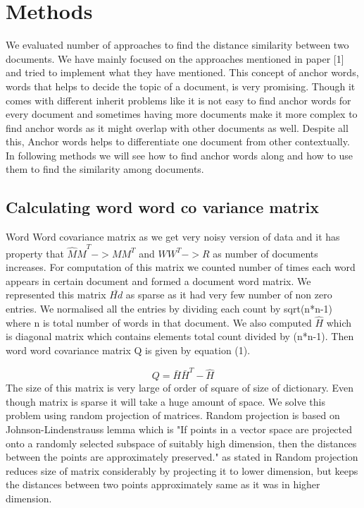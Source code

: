 \documentclass[a4paper,11pt]{article}
\begin{document}
\section{Methods}
We evaluated number of approaches to find the distance similarity between two documents. We have mainly focused on the approaches mentioned in paper [1] and tried to implement what they have mentioned. This concept of anchor words, words that helps to decide the topic of a document, is very promising. Though it comes with different inherit problems like it is not easy to find anchor words for every document and sometimes having more documents make it more complex to find anchor words as it might overlap with other documents as well. Despite all this, Anchor words helps to differentiate one document from other contextually. In following methods we will see how to find anchor words along and how to use them to find the similarity among documents. \\

\subsection{Calculating word word co variance matrix}

Word Word covariance matrix as we get very noisy version of data and it has property that  $\hat{M} \hat{M}^T -> M M^T $ and $W W^T -> R$ as number of documents increases. For computation of this matrix we counted number of times each word appears in certain document and formed a document word matrix. We represented this matrix $\bar{Hd}$ as sparse as it had very few number of non zero entries. We normalised all the entries by dividing each count by sqrt(n*n-1) where n is total number of words in that document. We also computed $\hat{H}$ which is diagonal matrix which contains elements total count divided by (n*n-1). Then word word covariance matrix Q is given by equation (1).

\begin{equation}
Q = \bar{H} \bar{H}^T - \hat{H}
\end{equation}
The size of this matrix is very large of order of square of size of dictionary. Even though matrix is sparse it will take a huge amount of space. We solve this problem using random projection of matrices. Random projection is based on Johnson-Lindenstrauss lemma which is "If points in a vector space are projected onto a randomly selected subspace of suitably high dimension, then the distances between the points are approximately preserved." as stated in \cite{Random projection} Random projection reduces size of matrix considerably by projecting it to lower dimension, but keeps the distances between two points approximately same as it was in higher dimension.
\end{document}
